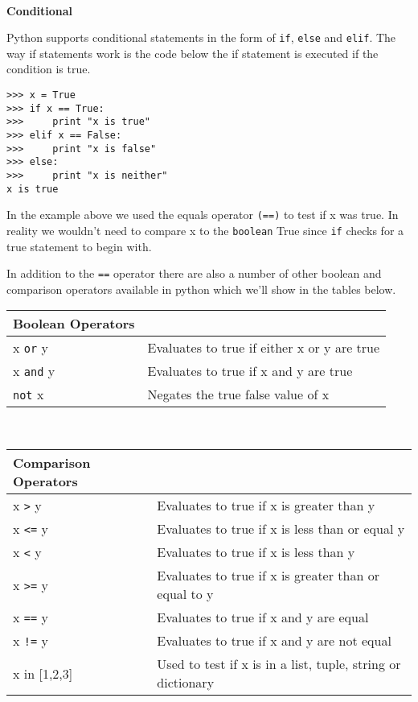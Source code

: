 \documentclass[letterpaper,11pt]{article}
\begin{document}
\\
\textbf{Conditional}
\par{Python supports conditional statements in the form of \texttt{if},
\texttt{else} and \texttt{elif}. The way if statements work is the code below
the if statement is executed if the condition is true.} 
\\
\begin{minipage}{.5\textwidth}
    \begin{tcolorbox}
        \begin{footnotesize}
            \begin{verbatim}
>>> x = True
>>> if x == True:
>>>     print "x is true"
>>> elif x == False:
>>>     print "x is false"
>>> else:
>>>     print "x is neither"
x is true
            \end{verbatim}
        \end{footnotesize}
    \end{tcolorbox}
\end{minipage}
\par{In the example above we used the equals operator \texttt{(==)} to test if x
was true. In reality we wouldn't need to compare x to the \texttt{boolean} True
since \texttt{if} checks for a true statement to begin with.}
\par{In addition to the \texttt{==} operator there are also a number of other
boolean and comparison operators available in python which we'll show in the
tables below.}
\\ 
\begin{tabular}[t]{l l}
    \textbf{Boolean Operators}  \\
    \hline
    x \texttt{or} y  & Evaluates to true if either x or y are true \\
    x \texttt{and} y & Evaluates to true if x and y are true       \\
    \texttt{not} x   & Negates the true false value of x           \\
\end{tabular}
\\
\begin{tabular}[t]{l l}
    \textbf{Comparison Operators}  \\
    \hline
    x \texttt{>}  y & Evaluates to true if x is greater than y             \\
    x \texttt{<=} y & Evaluates to true if x is less than or equal y       \\
    x \texttt{<}  y & Evaluates to true if x is less than y                \\
    x \texttt{>=} y & Evaluates to true if x is greater than or equal to y \\
    x \texttt{==} y & Evaluates to true if x and y are equal               \\
    x \texttt{!=} y & Evaluates to true if x and y are not equal           \\
    x in [1,2,3]    & Used to test if x is in a list, tuple, string or dictionary \\ 
\end{tabular}
\end{document}
